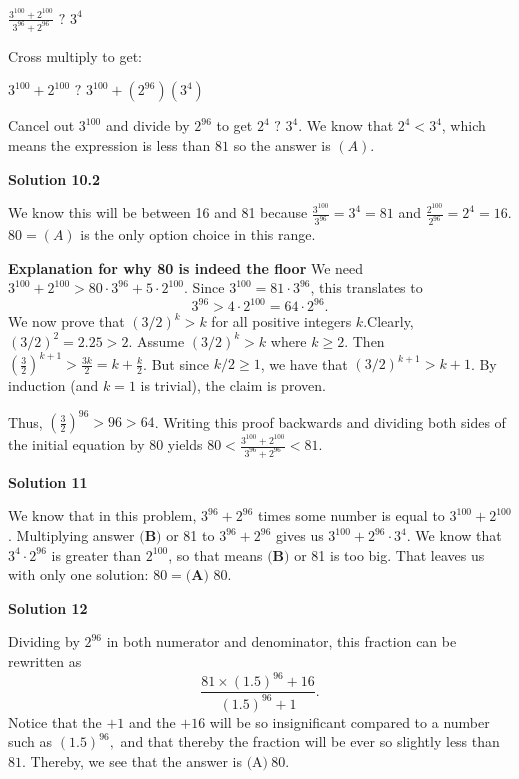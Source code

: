 \begin{enumerate}
 $\frac{3^{100}+2^{100}}{3^{96}+2^{96}} \text{ ? } 3^4$

 Cross multiply to get:

 $3^{100}+2^{100} \text{ ? }3^{100}+(2^{96})(3^4)$

 Cancel out $3^{100}$ and divide by $2^{96}$ to get $2^{4} \text{ ? }3^4$. We know that $2^4 < 3^4$, which means the expression is less than $81$ so the answer is $\boxed{(A)}$.

 



\textbf{Solution 10.2}

We know this will be between 16 and 81 because $\frac{3^{100}}{3^{96}} = 3^4 = 81$ and $\frac{2^{100}}{2^{96}} = 2^4 = 16$. $80=\boxed{(A)}$ is the only option choice in this range.

 


 \textbf{Explanation for why 80 is indeed the floor} We need $3^{100}+2^{100} > 80 \cdot 3^{96} + 5 \cdot 2^{100}$. Since $3^{100} = 81\cdot 3^{96}$, this translates to
 \[3^{96} > 4\cdot 2^{100} = 64\cdot 2^{96}.\]We now prove that $(3/2)^k > k$ for all positive integers $k$.Clearly, $(3/2)^2 = 2.25 > 2$. Assume $(3/2)^k > k$ where $k\ge 2$. Then $\left(\frac{3}{2}\right)^{k+1} > \frac{3k}{2} = k + \frac{k}{2}$. But since $k/2 \ge 1$, we have that $(3/2)^{k+1} > k+1$. By induction (and $k=1$ is trivial), the claim is proven.

 Thus, $\left(\frac{3}{2}\right)^{96} > 96 > 64$. Writing this proof backwards and dividing both sides of the initial equation by $80$ yields $80 < \frac{3^{100}+2^{100}}{3^{96}+2^{96}} < 81$.

 


 



\textbf{Solution 11}

We know that in this problem, $3^{96}+2^{96}$ times some number is equal to $3^{100}+2^{100}$. Multiplying answer $\boxed{\textbf{(B)}}$ or 81 to $3^{96}+2^{96}$ gives us $3^{100}+2^{96}\cdot3^4$. We know that $3^4\cdot2^{96}$ is greater than $2^{100}$, so that means $\boxed{\textbf{(B)}}$ or 81 is too big. That leaves us with only one solution: $80=\boxed{\textbf{(A) } 80}.$




\textbf{Solution 12}

Dividing by $2^{96}$ in both numerator and denominator, this fraction can be rewritten as 
 \[\frac{81 \times (1.5)^{96} + 16}{(1.5)^{96} + 1}.\] Notice that the $+1$ and the $+16$ will be so insignificant compared to a number such as $(1.5)^{96},$ and that thereby the fraction will be ever so slightly less than $81$. Thereby, we see that the answer is $\boxed{\text{(A)} \ 80}.$





\end{enumerate}
